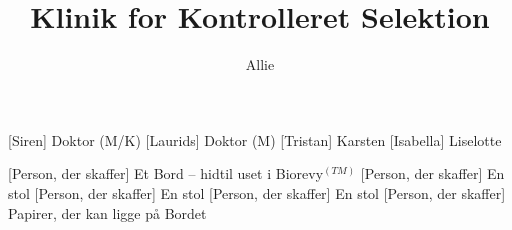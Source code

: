\documentclass[a4paper,11pt]{article}
\title{Klinik for Kontrolleret Selektion}
\author{Allie}
\begin{document}
\maketitle

\begin{roles}
    [Siren] Doktor (M/K)
    [Laurids] Doktor (M)
    [Tristan] Karsten
    [Isabella] Liselotte
\end{roles}

\begin{props}
    [Person, der skaffer] Et Bord -- hidtil uset i Biorevy$^{(TM)}$
    [Person, der skaffer] En stol
    [Person, der skaffer] En stol
    [Person, der skaffer] En stol
    [Person, der skaffer] Papirer, der kan ligge på Bordet
\end{props}
\end{document}
